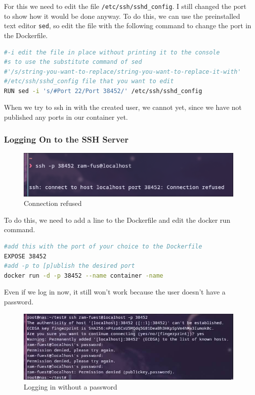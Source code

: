\documentclass[a4paper]{article}
\newcommand{\abc}{\hfill \break}
\begin{document}
For this we need to edit the file \texttt{/etc/ssh/sshd\_config}. \abc
I still changed the port to show how it would be done anyway.
To do this, we can use the preinstalled text editor \texttt{sed}, so edit the file with the following command to change the port in the Dockerfile.
\begin{lstlisting}[language=bash]
#-i edit the file in place without printing it to the console
#s to use the substitute command of sed
#'/s/string-you-want-to-replace/string-you-want-to-replace-it-with'
#/etc/ssh/sshd_config file that you want to edit
RUN sed -i 's/#Port 22/Port 38452/' /etc/ssh/sshd_config
\end{lstlisting}
When we try to ssh in with the created user, we cannot yet, since we have not published any ports in our container yet.
\subsubsection{Logging On to the SSH Server}
\begin{figure}[h]
	\centering
	\includegraphics[scale=0.4]{images/loggingin-before-expsing-the-port.png}
	\caption{Connection refused}
\end{figure} 
To do this, we need to add a line to the Dockerfile and edit the docker run command.
\begin{lstlisting}[language=bash]
#add this with the port of your choice to the Dockerfile
EXPOSE 38452
#add -p to [p]ublish the desired port
docker run -d -p 38452 --name container -name
\end{lstlisting}
Even if we log in now, it still won't work because the user doesn't have a password.
\begin{figure}[h]
	\centering
	\includegraphics[scale=0.4]{images/failingtologin.png}
	\caption{Logging in without a password}
\end{figure} \abc
\end{document}
